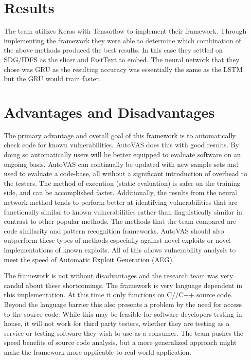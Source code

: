 \documentclass[]{article}
\begin{document}
\section{Results}

The team utilizes Keras with Tensorflow to implement their framework.
Through implementing the framework they were able to determine which combination of the above methods produced the best results.
In this case they settled on SDG/IDFS as the slicer and FastText to embed.
The neural network that they chose was GRU as the resulting accuracy was essentially the same as the LSTM but the GRU would train faster.

\section{Advantages and Disadvantages}

The primary advantage and overall goal of this framework is to automatically check code for known vulnerabilities. 
AutoVAS does this with good results.
By doing so automatically users will be better equipped to evaluate software on an ongoing basis.
AutoVAS can continually be updated with new sample sets and used to evaluate a code-base, all without a significant introduction of overhead to the testers.
The method of execution (static evaluation) is safer on the training side, and can be accomplished faster.
Additionally, the results from the neural network method tends to perform better at identifying vulnerabilities that are functionally similar to known vulnerabilities rather than linguistically similar in contrast to other popular methods.
The methods that the team compared are code similarity and pattern recognition frameworks. 
AutoVAS should also outperform these types of methods especially against novel exploits or novel implementations of known exploits.
All of this allows vulnerability analysis to meet the speed of Automatic Exploit Generation (AEG).

The framework is not without disadvantages and the research team was very candid about these shortcomings.
The framework is very language dependent in this implementation.
At this time it only functions on C//C++ source code.
Beyond the language barrier this also presents a problem by the need for access to the source-code.
While this may be feasible for software developers testing in-house, it will not work for third party testers, whether they are testing as a service or testing software they wish to use as a consumer.
The team pushes the speed benefits of source code analysis, but a more generalized approach might make the framework more applicable to real world application.
\end{document}
